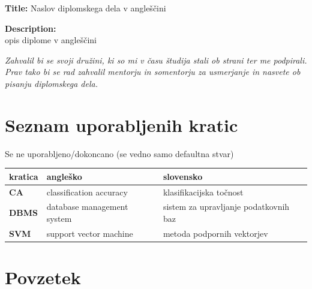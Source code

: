 \documentclass[a4paper,12pt,openright]{book}
\newcommand{\clearemptydoublepage}{\newpage{\pagestyle{empty}\cleardoublepage}}
\begin{document}
{\bigskip
\noindent\textbf{Title:} Naslov diplomskega dela v angleščini

\bigskip
\noindent\textbf{Description:}\\
opis diplome v angleščini

\vfill



\vspace{2cm}

\clearemptydoublepage

\thispagestyle{empty}\mbox{}\vfill\null\it%
\noindent
Zahvalil bi se svoji družini, ki so mi v času študija stali ob strani ter me podpirali.
Prav tako bi se rad zahvalil mentorju in somentorju za usmerjanje in nasvete ob pisanju diplomskega dela. 
\rm\normalfont

\clearemptydoublepage

\pagestyle{empty}
\def\thepage{}%
\tableofcontents{}


\clearemptydoublepage


\chapter*{Seznam uporabljenih kratic}
Se ne uporabljeno/dokoncano (se vedno samo defaultna stvar) \newline
\noindent\begin{tabular}{p{}|p{}|p{}}    %
  {\bf kratica} & {\bf angleško}                              & {\bf slovensko} \\ \hline
  {\bf CA}      & classification accuracy               & klasifikacijska točnost \\
  {\bf DBMS} & database management system & sistem za upravljanje podatkovnih baz \\
  {\bf SVM}   & support vector machine              & metoda podpornih vektorjev \\
\end{tabular}


\clearemptydoublepage

\chapter*{Povzetek}

}
\end{document}
